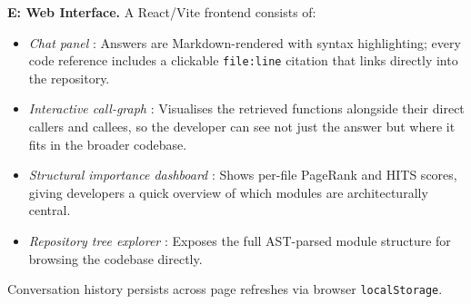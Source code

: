 \documentclass[conference]{IEEEtran}
\begin{document}
\textbf{E: Web Interface.} A React/Vite frontend consists of:
\begin{itemize}
  \item \emph{Chat panel} : Answers are Markdown-rendered with
        syntax highlighting; every code reference includes a clickable
        \texttt{file:line} citation that links directly into the repository.
  \item \emph{Interactive call-graph} : Visualises the retrieved
        functions alongside their direct callers and callees, so the
        developer can see not just the answer but where it fits in the
        broader codebase.
  \item \emph{Structural importance dashboard} : Shows per-file
        PageRank and HITS scores, giving developers a quick overview of
        which modules are architecturally central.
  \item \emph{Repository tree explorer} : Exposes the full
        AST-parsed module structure for browsing the codebase directly.
\end{itemize}
Conversation history persists across page refreshes via browser
\texttt{localStorage}.
\end{document}
